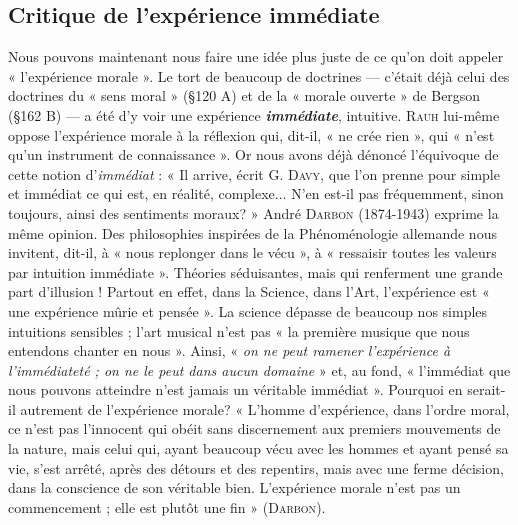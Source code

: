\subsection{Critique de l'expérience immédiate}%
Nous pouvons
maintenant nous faire une idée plus juste de ce qu’on doit appeler
« l’expérience morale ». Le tort de beaucoup de doctrines — c'était
déjà celui des doctrines du « sens moral » (\S 120 A) et de la « morale
ouverte » de Bergson (\S 162 B) — a été d’y voir une expérience \textbf{\textit {immédiate}},
intuitive. \textsc{Rauh} lui-même oppose l'expérience morale à la
réflexion qui, dit-il, « ne crée rien », qui « n’est qu’un instrument
de connaissance ». Or nous avons déjà dénoncé l’équivoque de
cette notion d’{\it immédiat} : « Il arrive, écrit G. \textsc{Davy}, que l’on prenne
pour simple et immédiat ce qui est, en réalité, complexe... N'en
est-il pas fréquemment, sinon toujours, ainsi des sentiments
moraux? » André \textsc{Darbon} (1874-1943) exprime la même opinion.
Des philosophies inspirées de la Phénoménologie allemande nous
invitent, dit-il, à « nous replonger dans le vécu », à « ressaisir toutes
les valeurs par intuition immédiate ». Théories séduisantes, mais qui
renferment une grande part d’illusion ! Partout en effet, dans la
Science, dans l’Art, l'expérience est « une expérience mûrie et pensée ».
La science dépasse de beaucoup nos simples intuitions sensibles ; l’art
musical n’est pas « la première musique que nous entendons chanter
en nous ». Ainsi, « {\it on ne peut ramener l'expérience à l’immédiateté ; on ne
le peut dans aucun domaine} » et, au fond, « l’immédiat que nous pouvons
atteindre n’est jamais un véritable immédiat ». Pourquoi en
serait-il autrement de l’expérience morale? « L'homme d’expérience,
dans l’ordre moral, ce n’est pas l’innocent qui obéit sans discernement
aux premiers mouvements de la nature, mais celui qui, ayant beaucoup
vécu avec les hommes et ayant pensé sa vie, s’est arrêté, après des
détours et des repentirs, mais avec une ferme décision, dans la conscience
de son véritable bien. L'expérience morale n’est pas un commencement ;
elle est plutôt une fin » (\textsc{Darbon}).

